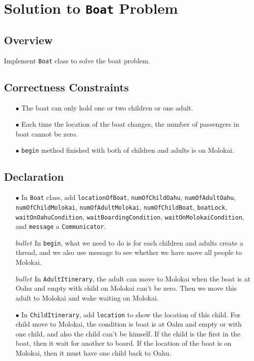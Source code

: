 \documentclass{article}
\begin{document}
\section{Solution to \texttt{Boat} Problem}
\subsection{Overview}

Implement \texttt{Boat} class to solve the boat problem.

\subsection{Correctness Constraints}

\begin{enumerate}
\item[$\bullet$] The boat can only hold one or two children or one adult.
\item[$\bullet$] Each time the location of the boat changes, the number of passengers in boat cannot be zero.
\item[$\bullet$] \texttt{begin} method finished with both of children and adults is on Molokai.
\end{enumerate}

\subsection{Declaration}

\begin{enumerate}
\item[$\bullet$] In \texttt{Boat} class, add \texttt{locationOfBoat}, \texttt{numOfChildOahu}, \texttt{numOfAdultOahu}, \texttt{numOfChildMolokai}, \texttt{numOfAdultMolokai}, \texttt{numOfChildBoat}, \texttt{boatLock}, \texttt{waitOnOahuCondition}, \texttt{waitBoardingCondition}, \texttt{waitOnMolokaiCondition}, and \texttt{message} a \texttt{Communicator}.
\item[$bullet$] In \texttt{begin}, what we need to do is for each children and adults create a thread, and we also use message to see whether we have move all people to Molokai.
\item[$bullet$] In \texttt{AdultItinerary}, the adult can  move to Molokai when the boat is at Oahu and empty with child on Molokai can't be zero. Then we move this adult to Molokai and wake waiting on Molokai.
\item[$\bullet$] In \texttt{ChildItinerary}, add \texttt{location} to show the location of this child. For child move to Molokai, the condition is boat is at Oahu and empty or with one child, and also the child can't be himself. If the child is the first in the boat, then it wait for another to board. If the location of the boat is on Molokai, then it must have one child back to Oahu.
\end{enumerate}
\end{document}
